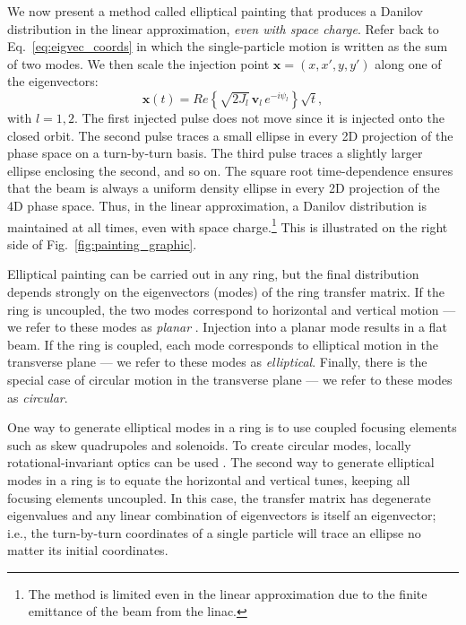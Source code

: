 We now present a method called elliptical painting that produces a Danilov distribution in the linear approximation, \textit{even with space charge}. Refer back to Eq.~\eqref{eq:eigvec_coords} in which the single-particle motion is written as the sum of two modes. We then scale the injection point $\mathbf{x} = (x, x', y, y')$ along one of the eigenvectors:
%
\begin{equation}\label{eq:elliptical_painting}
    \mathbf{x}(t) =  
    Re \left\{ \sqrt{2 J_l} \, \mathbf{v}_l \, e^{-i\psi_l} \right\} \sqrt{t},
\end{equation}
%
with $l = 1,2$. The first injected pulse does not move since it is injected onto the closed orbit. The second pulse traces a small ellipse in every 2D projection of the phase space on a turn-by-turn basis. The third pulse traces a slightly larger ellipse enclosing the second, and so on. The square root time-dependence ensures that the beam is always a uniform density ellipse in every 2D projection of the 4D phase space. Thus, in the linear approximation, a Danilov distribution is maintained at all times, even with space charge.\footnote{The method is limited even in the linear approximation due to the finite emittance of the beam from the linac.} This is illustrated on the right side of Fig.~\ref{fig:painting_graphic}.

Elliptical painting can be carried out in any ring, but the final distribution depends strongly on the eigenvectors (modes) of the ring transfer matrix. If the ring is uncoupled, the two modes correspond to horizontal and vertical motion — we refer to these modes as \textit{planar} \cite{Burov2002}. Injection into a planar mode results in a flat beam. If the ring is coupled, each mode corresponds to elliptical motion in the transverse plane — we refer to these modes as \textit{elliptical}. Finally, there is the special case of circular motion in the transverse plane — we refer to these modes as \textit{circular}.

One way to generate elliptical modes in a ring is to use coupled focusing elements such as skew quadrupoles and solenoids. To create circular modes, locally rotational-invariant optics can be used \cite{Burov2002}. The second way to generate elliptical modes in a ring is to equate the horizontal and vertical tunes, keeping all focusing elements uncoupled. In this case, the transfer matrix has degenerate eigenvalues and any linear combination of eigenvectors is itself an eigenvector; i.e., the turn-by-turn coordinates of a single particle will trace an ellipse no matter its initial coordinates. 


